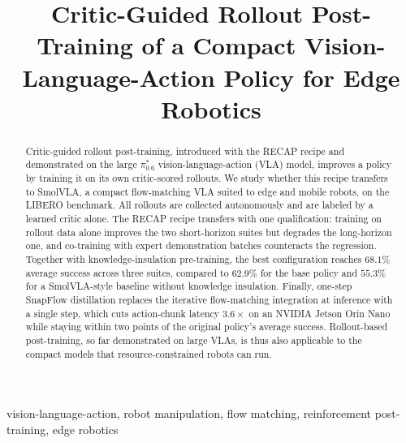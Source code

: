 \documentclass[conference]{IEEEtran}
\begin{document}
\title{Critic-Guided Rollout Post-Training of a Compact Vision-Language-Action Policy for Edge Robotics}

\author{
}

\maketitle

\begin{abstract}
Critic-guided rollout post-training, introduced with the RECAP recipe and demonstrated on the
large $\pi^{*}_{0.6}$ vision-language-action (VLA) model, improves a policy by training it on
its own critic-scored rollouts. We study whether this recipe transfers to SmolVLA, a compact
flow-matching VLA suited to edge and mobile robots, on the LIBERO benchmark. All rollouts are
collected autonomously and are labeled by a learned critic alone. The RECAP recipe transfers
with one qualification: training on rollout data alone improves the two short-horizon suites
but degrades the long-horizon one, and co-training with expert demonstration batches
counteracts the regression. Together with knowledge-insulation pre-training, the best
configuration reaches $68.1\%$ average success across three suites, compared to $62.9\%$ for
the base policy and $55.3\%$ for a SmolVLA-style baseline without knowledge insulation.
Finally, one-step SnapFlow distillation replaces the iterative flow-matching integration at
inference with a single step, which cuts action-chunk latency $3.6\times$ on an NVIDIA Jetson
Orin Nano while staying within two points of the original policy's average success.
Rollout-based post-training, so far demonstrated on large VLAs, is thus also applicable to
the compact models that resource-constrained robots can run.
\end{abstract}

\begin{IEEEkeywords}
vision-language-action, robot manipulation, flow matching, reinforcement post-training,
edge robotics
\end{IEEEkeywords}
\end{document}
